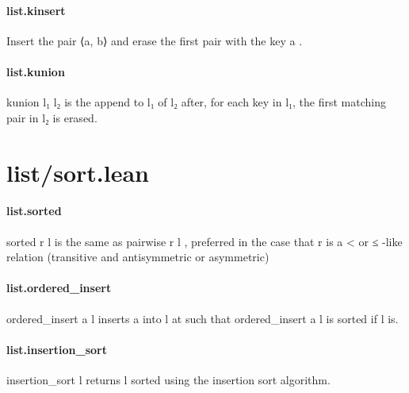 \documentclass{article}
\begin{document}
\paragraph{list.kinsert}
\par
Insert the pair 
\colorbox[RGB]{253,246,227}{{{{\color[RGB]{101, 123, 131} ⟨a, b⟩ }}}} and erase the first pair with the key 
\colorbox[RGB]{253,246,227}{{{{\color[RGB]{101, 123, 131} a }}}}.
\paragraph{list.kunion}
\par
\colorbox[RGB]{253,246,227}{{{{\color[RGB]{101, 123, 131} kunion l₁ l₂ }}}} is the append to l₁ of l₂ after, for each key in l₁, the
first matching pair in l₂ is erased.
\section{list/sort.lean}\paragraph{list.sorted}
\par
\colorbox[RGB]{253,246,227}{{{{\color[RGB]{101, 123, 131} sorted r l }}}} is the same as 
\colorbox[RGB]{253,246,227}{{{{\color[RGB]{101, 123, 131} pairwise r l }}}}, preferred in the case that 
\colorbox[RGB]{253,246,227}{{{{\color[RGB]{101, 123, 131} r }}}}is a 
\colorbox[RGB]{253,246,227}{{{{\color[RGB]{181, 137, 0} < }}}} or 
\colorbox[RGB]{253,246,227}{{{{\color[RGB]{181, 137, 0} ≤ }}}}-like relation (transitive and antisymmetric or asymmetric)
\paragraph{list.ordered\_insert}
\par
\colorbox[RGB]{253,246,227}{{{{\color[RGB]{101, 123, 131} ordered\_insert a l }}}} inserts 
\colorbox[RGB]{253,246,227}{{{{\color[RGB]{101, 123, 131} a }}}} into 
\colorbox[RGB]{253,246,227}{{{{\color[RGB]{101, 123, 131} l }}}} at such that
\colorbox[RGB]{253,246,227}{{{{\color[RGB]{101, 123, 131} ordered\_insert a l }}}} is sorted if 
\colorbox[RGB]{253,246,227}{{{{\color[RGB]{101, 123, 131} l }}}} is.
\paragraph{list.insertion\_sort}
\par
\colorbox[RGB]{253,246,227}{{{{\color[RGB]{101, 123, 131} insertion\_sort l }}}} returns 
\colorbox[RGB]{253,246,227}{{{{\color[RGB]{101, 123, 131} l }}}} sorted using the insertion sort algorithm.
\end{document}
